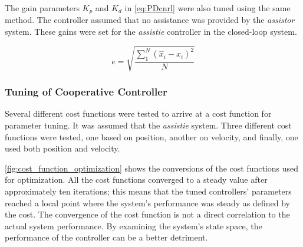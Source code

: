 The gain parameters $K_p$ and $K_d$ in \autoref{eq:PDcnrl} were also tuned using the same method. The controller assumed that no assistance was provided by the \textit{assistor} system. These gains were set for the \textit{assistie} controller in the closed-loop system.

\begin{equation}
    e = \sqrt{ \frac{ \sum_1^N ( \hat{x}_i - x_i )^2 }{N}  }
    \label{eq:RMSE}
\end{equation}

\subsubsection{Tuning of Cooperative Controller}
Several different cost functions were tested to arrive at a cost function for parameter tuning. It was assumed that the \textit{assistie} system. Three different cost functions were tested, one based on position, another on velocity, and finally, one used both position and velocity.


\autoref{fig:cost_function_optimization} shows the conversions of the cost functions used for optimization. All the cost functions converged to a steady value after approximately ten iterations; this means that the tuned controllers' parameters reached a local point where the system's performance was steady as defined by the cost. The convergence of the cost function is not a direct correlation to the actual system performance. By examining the system's state space, the performance of the controller can be a better detriment.





